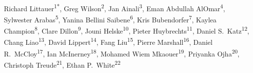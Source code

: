 \documentclass[10pt,letterpaper]{article}
\begin{document}
\vspace*{0.2in}

\begin{flushleft}
{\Large
\textbf{}
}
\newline
\\
Richard Littauer\textsuperscript{1*},
Greg Wilson\textsuperscript{2},
Jan Ainali\textsuperscript{3},
Eman Abdullah AlOmar\textsuperscript{4},
Sylwester Arabas\textsuperscript{5},
Yanina Bellini Saibene\textsuperscript{6},
Kris Bubendorfer\textsuperscript{7},
Kaylea Champion\textsuperscript{8},
Clare Dillon\textsuperscript{9},
Jouni Helske\textsuperscript{10},
Pieter Huybrechts\textsuperscript{11},
Daniel S.\ Katz\textsuperscript{12},
Chang Liao\textsuperscript{13},
David Lippert\textsuperscript{14},
Fang Liu\textsuperscript{15},
Pierre Marshall\textsuperscript{16},
Daniel R.\ McCloy\textsuperscript{17},
Ian McInerney\textsuperscript{18},
Mohamed Wiem Mkaouer\textsuperscript{19},
Priyanka Ojha\textsuperscript{20},
Christoph Treude\textsuperscript{21},
Ethan P.\ White\textsuperscript{22}
\\
\bigskip


\end{flushleft}
\end{document}
